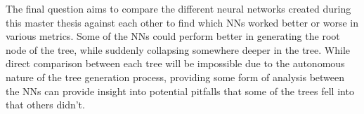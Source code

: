 The final question aims to compare the different neural networks created during this master thesis against each other to find which NNs worked better or worse in various metrics.
Some of the NNs could perform better in generating the root node of the tree, while suddenly collapsing somewhere deeper in the tree.
While direct comparison between each tree will be impossible due to the autonomous nature of the tree generation process, providing some form of analysis between the NNs can provide insight into potential pitfalls that some of the trees fell into that others didn't.


